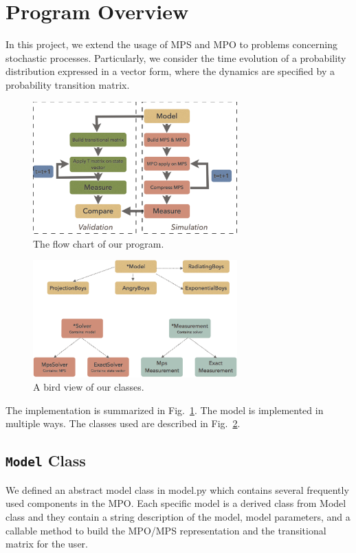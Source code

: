 \documentclass[english]{article}
\begin{document}
\section{Program Overview}
In this project, we extend the usage of MPS and MPO to problems concerning stochastic processes. Particularly, we  consider the time evolution of a probability distribution expressed in a vector form, where the dynamics are specified by a probability transition matrix.

\begin{figure}[htbp]
\begin{center}
\includegraphics[width=0.7\textwidth]{flow_chart_new.pdf}
\caption{The flow chart of our program.}
\label{fig:flow_chart}
\end{center}
\end{figure}

\begin{figure}[htbp]
\begin{center}
\includegraphics[width=0.7\textwidth]{class_diagram_new.pdf}
\caption{A bird view of our classes.}
\label{fig:class_diagram}
\end{center}
\end{figure}


The implementation is summarized in Fig.~\ref{fig:flow_chart}. The model is implemented in multiple ways. The classes used are described in Fig.~\ref{fig:class_diagram}.
\subsection{\texttt{Model} Class}
We defined an abstract model class in model.py which contains several frequently used components in the MPO. Each specific model is a derived class from Model class and they contain a string description of the model, model parameters, and a callable method to build the MPO/MPS representation and the transitional matrix for the user.
\end{document}
